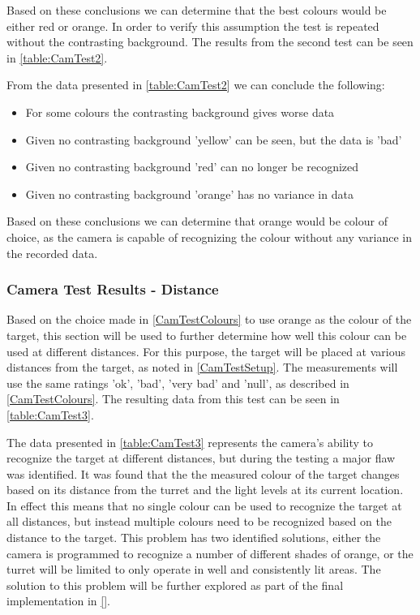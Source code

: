 Based on these conclusions we can determine that the best colours would be
either red or orange. In order to verify this assumption the test is repeated
without the contrasting background. The results from the second test can be seen
in \autoref{table:CamTest2}.


From the data presented in \autoref{table:CamTest2} we can conclude the
following:
\begin{itemize}
  \item For some colours the contrasting background gives worse data
  \item Given no contrasting background 'yellow' can be seen, but the data is
  'bad'
  \item Given no contrasting background 'red' can no longer be recognized
  \item Given no contrasting background 'orange' has no variance in data
\end{itemize} 

Based on these conclusions we can determine that orange would be colour of
choice, as the camera is capable of recognizing the colour without any variance
in the recorded data.

\subsubsection{Camera Test Results - Distance}\label{CamTestDistance}
Based on the choice made in \autoref{CamTestColours} to use orange as the colour
of the target, this section will be used to further determine how well this
colour can be used at different distances. For this purpose, the target will be
placed at various distances from the target, as noted in \autoref{CamTestSetup}.
The measurements will use the same ratings 'ok', 'bad', 'very bad' and 'null',
as described in \autoref{CamTestColours}. The resulting data from this test can be
seen in \autoref{table:CamTest3}. 


The data presented in \autoref{table:CamTest3} represents the camera's ability
to recognize the target at different distances, but during the testing a major
flaw was identified. It was found that the the measured colour of the target
changes based on its distance from the turret and the light levels at its
current location. In effect this means that no single colour can be used to
recognize the target at all distances, but instead multiple colours need to be
recognized based on the distance to the target. This problem has two identified
solutions, either the camera is programmed to recognize a number of different
shades of orange, or the turret will be limited to only operate in well and
consistently lit areas. The solution to this problem will be further explored
as part of the final implementation in \autoref{}.

